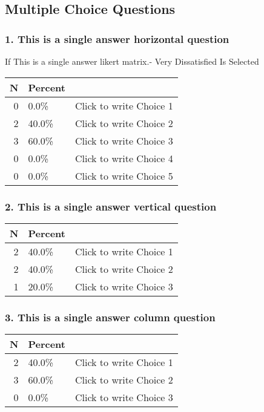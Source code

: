 \documentclass{article}\usepackage[]{graphicx}\usepackage[]{color}
\begin{document}
\hfill \break \hfill \break
\subsection*{Multiple Choice Questions}
\subsubsection*{1.
This is a single answer horizontal question}
If This is a single answer likert matrix.- Very Dissatisfied Is Selected 

\begin{tabular}{r|l|l}
\hline
N & Percent & \\
\hline
0 & 0.0\% & Click to write Choice 1\\
\hline
2 & 40.0\% & Click to write Choice 2\\
\hline
3 & 60.0\% & Click to write Choice 3\\
\hline
0 & 0.0\% & Click to write Choice 4\\
\hline
0 & 0.0\% & Click to write Choice 5\\
\hline
\end{tabular}


\hfill \break \hfill \break
\subsubsection*{2.
This is a single answer vertical question}


\begin{tabular}{r|l|l}
\hline
N & Percent & \\
\hline
2 & 40.0\% & Click to write Choice 1\\
\hline
2 & 40.0\% & Click to write Choice 2\\
\hline
1 & 20.0\% & Click to write Choice 3\\
\hline
\end{tabular}


\hfill \break \hfill \break
\subsubsection*{3.
This is a single answer column question}


\begin{tabular}{r|l|l}
\hline
N & Percent & \\
\hline
2 & 40.0\% & Click to write Choice 1\\
\hline
3 & 60.0\% & Click to write Choice 2\\
\hline
0 & 0.0\% & Click to write Choice 3\\
\hline
\end{tabular}
\end{document}
